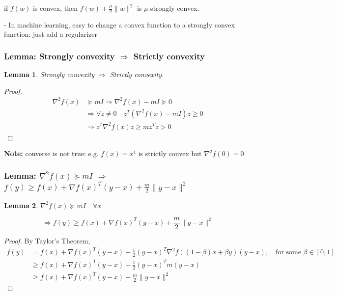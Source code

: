 \documentclass[11pt,a4paper]{article}
\newtheorem{lemma}{Lemma}
\begin{document}
if $f(w)$ is convex, then $f(w)+\frac{\mu}{2}\|w\|^{2}$ is $\mu$-strongly convex.

- In machine learning, easy to change a convex function to a strongly convex function: just add a regularizer

\subsubsection{Lemma: Strongly convexity $\Rightarrow$ Strictly convexity}
\begin{lemma}
    Strongly convexity $\Rightarrow$ Strictly convexity.
\end{lemma}
\begin{proof}
\begin{equation}
    \begin{aligned}
        \nabla^2 f(x)&\succeq mI \Rightarrow \nabla^2 f(x)-mI\succeq 0\\
        & \Rightarrow \forall z\neq 0\quad z^T(\nabla^2 f(x)-mI)z\geq 0\\
        & \Rightarrow z^T\nabla^2 f(x)z\geq mz^Tz>0
    \end{aligned}
    \nonumber
\end{equation}
\end{proof}
\textbf{Note: }converse is not true: e.g. $f(x)=x^4$ is strictly convex but $\nabla^2 f(0)=0$

\subsubsection{Lemma: $\nabla^2 f(x)\succeq mI$ $\Rightarrow$ $f(y)\geq f(x)+\nabla f(x)^T(y-x)+\frac{m}{2}\|y-x\|^2$}
\begin{lemma}
$\nabla^2 f(x)\succeq mI\quad \forall x$

$$\Rightarrow f(y)\geq f(x)+\nabla f(x)^T(y-x)+\frac{m}{2}\|y-x\|^2$$
\end{lemma}
\begin{proof}
    By Taylor's Theorem,
    \begin{equation}
        \begin{aligned}
            f(y)&=f(x)+\nabla f(x)^T(y-x)+\frac{1}{2}(y-x)^T \nabla^2 f((1-\beta)x+\beta y)(y-x),\quad \text{for some }\beta\in[0,1]\\
            &\geq f(x)+\nabla f(x)^T(y-x)+\frac{1}{2}(y-x)^Tm(y-x)\\
            &\geq f(x)+\nabla f(x)^T(y-x)+\frac{m}{2}\|y-x\|^2
        \end{aligned}
        \nonumber
    \end{equation}
\end{proof}
\end{document}

